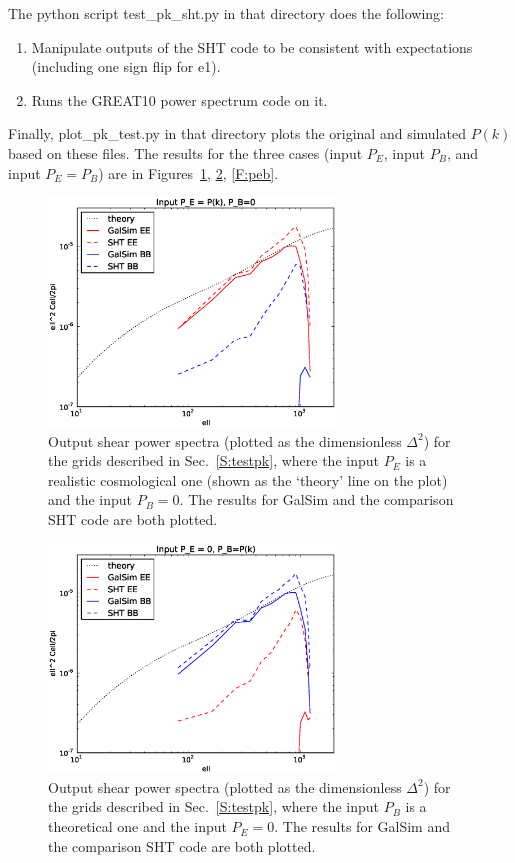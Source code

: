 \documentclass[preprint]{aastex}
\begin{document}
The python script test\_pk\_sht.py in that directory does the following:
\begin{enumerate}
\item Manipulate outputs of the SHT code to be consistent with
  expectations (including one sign flip for e1).
\item Runs the GREAT10 power spectrum code on it.
\end{enumerate}

Finally, plot\_pk\_test.py in that directory plots the original and
simulated $P(k)$ based on these files.  The results for the three
cases (input $P_E$, input $P_B$, and input $P_E=P_B$) are in
Figures~\ref{F:pe}, \ref{F:pb}, \ref{F:peb}.

\begin{figure}
\begin{center}
\includegraphics[width=3in]{../external/test_gridshear/output/compare_input_pe.eps}
\caption{Output shear power spectra (plotted as the dimensionless
  $\Delta^2$) for the grids described in Sec.~\ref{S:testpk}, where
  the input $P_E$ is a realistic cosmological one (shown as the `theory' line on
  the plot) and the input $P_B=0$. The results for GalSim and the
  comparison SHT code are both plotted.\label{F:pe}}
\end{center}
\end{figure}

\begin{figure}
\begin{center}
\includegraphics[width=3in]{../external/test_gridshear/output/compare_input_pb.eps}
\caption{Output shear power spectra (plotted as the dimensionless
  $\Delta^2$) for the grids described in Sec.~\ref{S:testpk}, where
  the input $P_B$ is a theoretical one and the input $P_E=0$. The results for GalSim and the
  comparison SHT code are both plotted.\label{F:pb}}
\end{center}
\end{figure}
\end{document}
